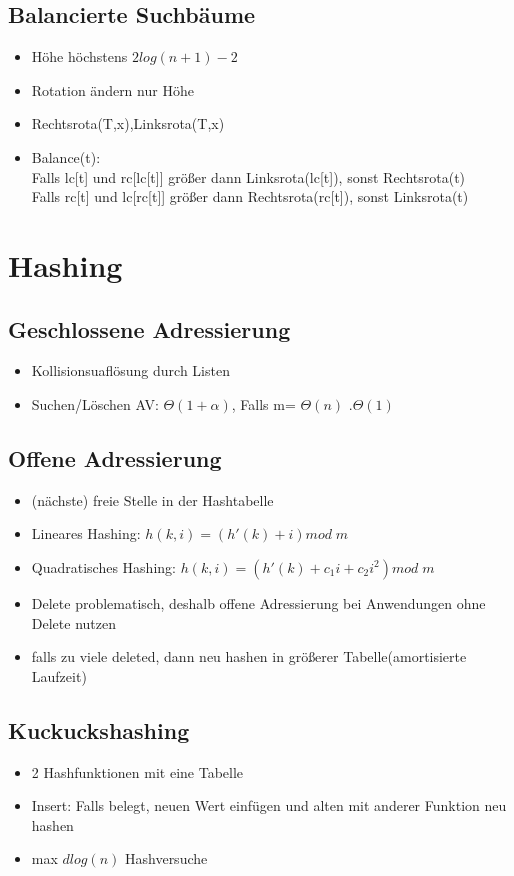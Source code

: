 \documentclass{article}
\begin{document}
\subsection{Balancierte Suchb{\"a}ume}
\begin{itemize}
\item H{\"o}he h{\"o}chstens $2log(n+1)-2$
\item Rotation {\"a}ndern nur H{\"o}he
\item Rechtsrota(T,x),Linksrota(T,x)
\item Balance(t): \\Falls lc[t] und rc[lc[t]] gr{\"o}\ss er dann Linksrota(lc[t]), sonst Rechtsrota(t) \\
	Falls rc[t] und lc[rc[t]] gr{\"o}\ss er dann Rechtsrota(rc[t]), sonst Linksrota(t)
\end{itemize}

\section{Hashing}
\subsection{Geschlossene Adressierung}
\begin{itemize}
\item Kollisionsuafl{\"o}sung durch Listen
\item Suchen/L{\"o}schen AV: $\Theta(1+\alpha)$, Falls  m= $\Theta(n)$ $.\Theta(1)$
\end{itemize}


\subsection{Offene Adressierung}
\begin{itemize}
\item (n{\"a}chste) freie Stelle in der Hashtabelle
\item Lineares Hashing: $h(k,i) = (h'(k) +i) mod \; m$
\item Quadratisches Hashing: $h(k,i) = (h'(k) +c_1i+ c_2 i^2) mod \; m$
\item Delete problematisch, deshalb offene Adressierung bei Anwendungen ohne Delete nutzen
\item falls zu viele deleted, dann neu hashen in gr{\"o}\ss erer Tabelle(amortisierte Laufzeit)
\end{itemize}

\subsection{Kuckuckshashing}
\begin{itemize}
\item 2 Hashfunktionen mit eine Tabelle
\item Insert: Falls belegt, neuen Wert einf{\"u}gen und alten mit anderer Funktion neu hashen
\item max $d log(n)$ Hashversuche
\end{itemize}
\end{document}
